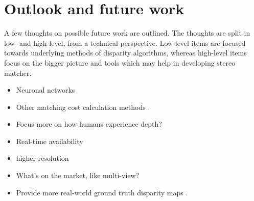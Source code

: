 \section{Outlook and future work}



A few thoughts on possible future work are outlined.
The thoughts are split in low- and high-level, from a technical perspective.
Low-level items are focused towards underlying methods of disparity algorithms, whereas high-level items focus on the bigger picture and tools which may help in developing stereo matcher.

\begin{itemize}
  \item Neuronal networks \citep{olshausen1996emergence}
  \item Other matching cost calculation methods \citep{hermann2010gradient}.
  \item Focus more on how humans experience depth? \citep{deangelis1995neuronal}
\end{itemize}

\begin{itemize}
  \item Real-time availability
  \item higher resolution
  \item What's on the market, like multi-view?
  \item Provide more real-world ground truth disparity maps \citep{kondermann2015stereo, Geiger2011IV}.
\end{itemize}
